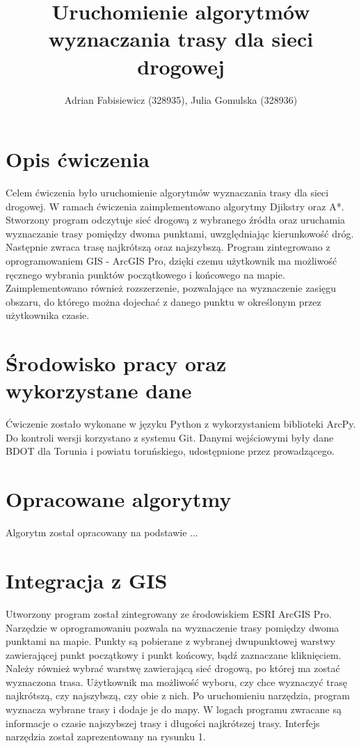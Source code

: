 \documentclass{article}
\title{Uruchomienie algorytmów wyznaczania trasy dla sieci drogowej}
\author{Adrian Fabisiewicz (328935), Julia Gomulska (328936)}
\begin{document}
\maketitle

\section{Opis ćwiczenia}

Celem ćwiczenia było uruchomienie algorytmów wyznaczania trasy dla sieci drogowej. W ramach ćwiczenia zaimplementowano algorytmy Djikstry oraz A*. Stworzony program odczytuje sieć drogową z wybranego źródła oraz uruchamia wyznaczanie trasy pomiędzy dwoma punktami, uwzględniając kierunkowość dróg. Następnie zwraca trasę najkrótszą oraz najszybszą. Program zintegrowano z oprogramowaniem GIS - ArcGIS Pro, dzięki czemu użytkownik ma możliwość ręcznego wybrania punktów początkowego i końcowego na mapie. Zaimplementowano również rozszerzenie, pozwalające na wyznaczenie zasięgu obszaru, do którego można dojechać z danego punktu w określonym przez użytkownika czasie.

\section{Środowisko pracy oraz wykorzystane dane}
Ćwiczenie zostało wykonane w języku Python z wykorzystaniem biblioteki ArcPy. Do kontroli wersji korzystano z systemu Git. Danymi wejściowymi były dane BDOT dla Torunia i powiatu toruńskiego, udostępnione przez prowadzącego.

\section{Opracowane algorytmy}
Algorytm został opracowany na podstawie ...

\section{Integracja z GIS}
Utworzony program został zintegrowany ze środowiskiem ESRI ArcGIS Pro. Narzędzie w oprogramowaniu pozwala na wyznaczenie trasy pomiędzy dwoma punktami na mapie. 
Punkty są pobierane z wybranej dwupunktowej warstwy zawierającej punkt początkowy i punkt końcowy, bądź zaznaczane kliknięciem. Należy również wybrać warstwę zawierającą sieć drogową, po której ma zostać wyznaczona trasa. Użytkownik ma możliwość wyboru, czy chce wyznaczyć trasę najkrótszą, czy najszybszą, czy obie z nich. Po uruchomieniu narzędzia, program wyznacza wybrane trasy i dodaje je do mapy. W logach programu zwracane są informacje o czasie najszybszej trasy i długości najkrótszej trasy. Interfejs narzędzia został zaprezentowany na rysunku 1.
\end{document}

